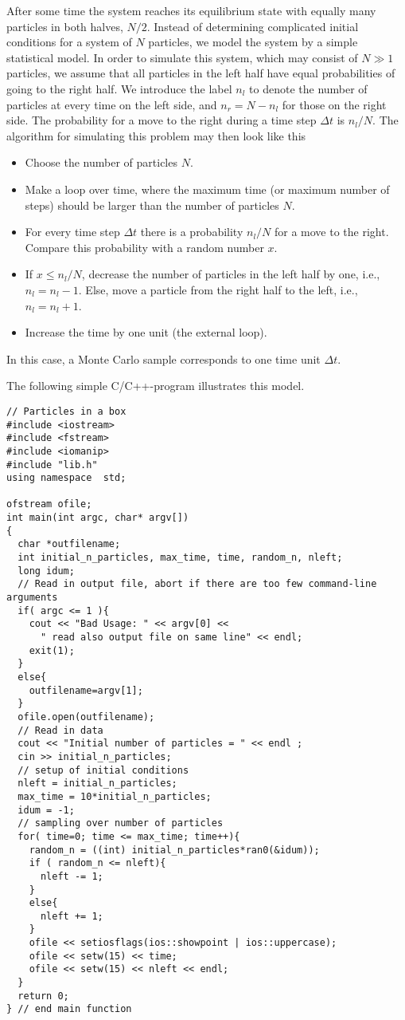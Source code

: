 After some time the system reaches its equilibrium state with
equally many particles in both halves, $N/2$. 
Instead of determining complicated initial conditions for a system 
of $N$ particles, we model the system by a simple statistical model. 
In order to simulate this system, which may consist of $N \gg 1$ particles,
we assume that all particles in the left half have equal probabilities
of going to the right half. 
We introduce the label $n_l$ to denote the 
 number of particles at every time on the left side, and $n_r=N-n_l$ for those
on the right side. 
The probability for a move to the right during a time step  $\Delta t$
is $n_l/N$. The algorithm for simulating this problem may then look
like this
\begin{svgraybox}
\begin{itemize}
   \item Choose the number of particles $N$.
   \item Make a loop over time, where the maximum time (or maximum number of steps) 
         should be larger
         than the number of particles $N$.
   \item For every time step $\Delta t$ there is a probability $n_l/N$ 
         for a move
         to the right.  Compare this probability with a random number $x$.
   \item If $ x \le n_l/N$, decrease the number of particles in the left
         half by one, i.e., $n_l=n_l-1$. Else, move a particle from the 
         right half to the left, i.e., $n_l=n_l+1$.
   \item Increase the time by one unit (the external loop).
\end{itemize}
\end{svgraybox}
In this case, a Monte Carlo sample corresponds to one time unit
$\Delta t$. 

The following simple C/C++-program illustrates this model.
\lstset{language=c++}
\begin{lstlisting}[title={\url{http://folk.uio.no/mhjensen/compphys/programs/chapter11/cpp/program2.cpp}}]
// Particles in a box
#include <iostream>
#include <fstream>
#include <iomanip>
#include "lib.h"
using namespace  std;

ofstream ofile;
int main(int argc, char* argv[])
{
  char *outfilename;
  int initial_n_particles, max_time, time, random_n, nleft; 
  long idum;
  // Read in output file, abort if there are too few command-line arguments
  if( argc <= 1 ){
    cout << "Bad Usage: " << argv[0] <<
      " read also output file on same line" << endl;
    exit(1);
  }
  else{
    outfilename=argv[1];
  }
  ofile.open(outfilename);
  // Read in data 
  cout << "Initial number of particles = " << endl ;
  cin >> initial_n_particles;
  // setup of initial conditions
  nleft = initial_n_particles;
  max_time = 10*initial_n_particles;
  idum = -1;
  // sampling over number of particles
  for( time=0; time <= max_time; time++){
    random_n = ((int) initial_n_particles*ran0(&idum));
    if ( random_n <= nleft){
      nleft -= 1;
    }
    else{
      nleft += 1;
    }
    ofile << setiosflags(ios::showpoint | ios::uppercase);
    ofile << setw(15) << time;
    ofile << setw(15) << nleft << endl;
  }
  return 0; 
} // end main function
\end{lstlisting}


